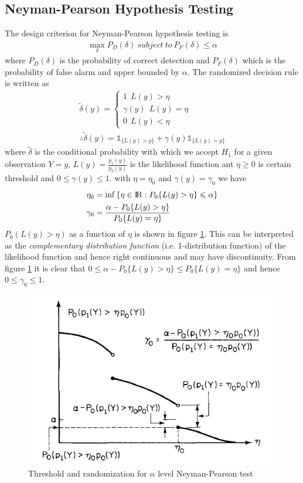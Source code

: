 \documentclass[a4paper,english,12pt]{article}
\begin{document}
\subsection{Neyman-Pearson Hypothesis Testing}
The design criterion for Neyman-Pearson hypothesis testing is 
\begin{eqnarray}
\max_{\delta}P_{D}(\delta)~subject~to~P_{F}(\delta)\leqslant\alpha
\end{eqnarray}
where $P_D(\delta)$ is the probability of correct detection and $P_F(\delta)$ which is the probability of false alarm and upper bounded by $\alpha$. The randomized decision rule is written as
\begin{eqnarray}
\tilde{\delta}(y)= \begin{cases} 1   ~~L(y)>\eta\\
                   \gamma(y)~~L(y)=\eta\\
                   0   ~~L(y)<\eta
                  \end{cases}\\
\therefore \tilde{\delta}(y)= \mathds{1}_{\{L(y)>y\}}+\gamma(y)\mathds{1}_{\{L(y)=y\}} \label{NP}               
\end{eqnarray}
where $\tilde{\delta}$ is the conditional probability with which we accept $H_1$ for a given observation $Y=y$, $L(y)=\frac{p_1(y)}{p_0(y)}$ is the likelihood function ant $\eta\geq0$ is certain threshold and $0\leq\gamma(y)\leq1$. with $\eta= \eta_0$ and $\gamma(y) = \gamma_0$ we have
\begin{align} 
\eta_{0}   &= \inf{\{\eta\in{\rm I\!R}:P_{0}\{L(y)>\eta\}\leqslant\alpha\}} \\
\gamma_{0} &= \frac{\alpha-P_{0}\{L(y)>\eta\}}{P_{0}\{L(y)=\eta\}}    
\end{align}
$P_0(L(y)>\eta)$ as a function of $\eta$ is shown in figure \ref{fig:Neyman1}. This can be interpreted as the \textit{complementary distribution function} (i.e. 1-distribution function) of the likelihood function and hence right continuous and may have discontinuity. From figure \ref{fig:Neyman1} it is clear that $0\leq\alpha-P_{0}\{L(y)>\eta\}\leq P_{0}\{L(y)=\eta\}$ and hence $0\leq\gamma_0\leq1$.
\begin{figure}[h]
\centering
\includegraphics[width=0.6\linewidth]{Figures/Neyman}
\caption{Threshold and randomization for $\alpha$ level Neyman-Pearson test}
\label{fig:Neyman1}
\end{figure}
\end{document}
